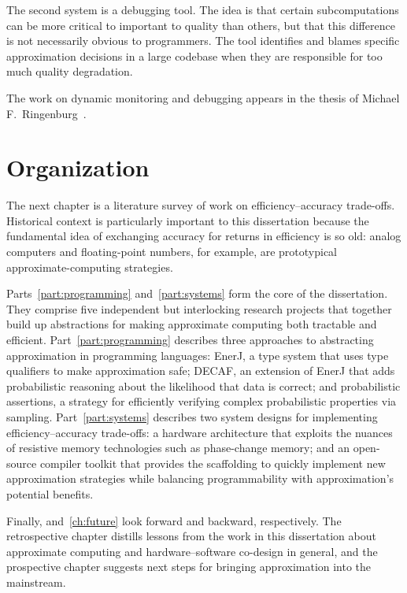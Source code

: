 The second system is a debugging tool.
The idea is that certain subcomputations can be more critical to important to
quality than others, but that this difference is not necessarily obvious to
programmers.
The tool identifies and blames specific approximation decisions in a large
codebase when they are responsible for too much quality degradation.

The work on dynamic monitoring and debugging appears in the thesis of
Michael F.\ Ringenburg~\cite{ringenburg-thesis}.


\section{Organization}

The next chapter is a literature survey of work on efficiency--accuracy
trade-offs.
Historical context is particularly important to this dissertation because the
fundamental idea of exchanging accuracy for returns in efficiency is so old:
analog computers and floating-point numbers, for example, are prototypical
approximate-computing strategies.

Parts~\ref{part:programming} and~\ref{part:systems} form the core of the
dissertation.
They comprise five independent but interlocking research projects that
together build up abstractions for making approximate computing both tractable
and efficient.
%
Part~\ref{part:programming} describes three approaches to abstracting
approximation in programming languages:
EnerJ, a type system that uses type qualifiers to make approximation safe;
DECAF, an extension of EnerJ that adds probabilistic reasoning
about the likelihood that data is correct;
and probabilistic assertions, a strategy for efficiently verifying complex
probabilistic properties via sampling.
%
Part~\ref{part:systems} describes two system designs for implementing
efficiency--accuracy trade-offs:
a hardware architecture that exploits the nuances of resistive memory
technologies such as phase-change memory;
and an open-source compiler toolkit that provides the scaffolding to quickly
implement new approximation strategies while balancing programmability with
approximation's potential benefits.

Finally,  and~\ref{ch:future} look forward and
backward, respectively.
The retrospective chapter distills lessons from the work in this dissertation
about approximate computing and hardware--software co-design in general, and
the prospective chapter suggests next steps for bringing approximation into
the mainstream.

